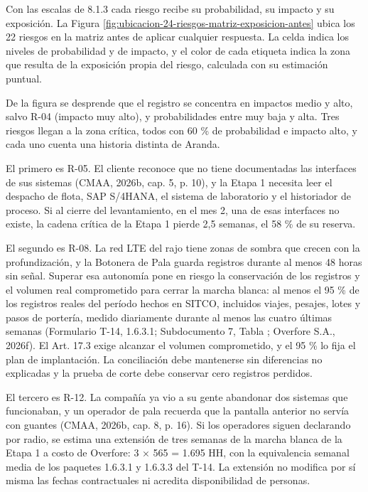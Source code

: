 \documentclass[subdoc]{../../comun/overfore}
\begin{document}
Con las escalas de 8.1.3 cada riesgo recibe su probabilidad, su impacto y su exposición. La Figura \ref{fig:ubicacion-24-riesgos-matriz-exposicion-antes} ubica los 22 riesgos en la matriz antes de aplicar cualquier respuesta. La celda indica los niveles de probabilidad y de impacto, y el color de cada etiqueta indica la zona que resulta de la exposición propia del riesgo, calculada con su estimación puntual.

De la figura se desprende que el registro se concentra en impactos medio y alto, salvo R-04 (impacto muy alto), y probabilidades entre muy baja y alta. Tres riesgos llegan a la zona crítica, todos con 60 \% de probabilidad e impacto alto, y cada uno cuenta una historia distinta de Aranda.

El primero es R-05. El cliente reconoce que no tiene documentadas las interfaces de sus sistemas (CMAA, 2026b, cap. 5, p. 10), y la Etapa 1 necesita leer el despacho de flota, SAP S/4HANA, el sistema de laboratorio y el historiador de proceso. Si al cierre del levantamiento, en el mes 2, una de esas interfaces no existe, la cadena crítica de la Etapa 1 pierde 2,5 semanas, el 58 \% de su reserva.

El segundo es R-08. La red LTE del rajo tiene zonas de sombra que crecen con la profundización, y la Botonera de Pala guarda registros durante al menos 48 horas sin señal. Superar esa autonomía pone en riesgo la conservación de los registros y el volumen real comprometido para cerrar la marcha blanca: al menos el 95 \% de los registros reales del período hechos en SITCO, incluidos viajes, pesajes, lotes y pasos de portería, medido diariamente durante al menos las cuatro últimas semanas (Formulario T-14, 1.6.3.1; Subdocumento 7, Tabla ; Overfore S.A., 2026f). El Art. 17.3 exige alcanzar el volumen comprometido, y el 95 \% lo fija el plan de implantación. La conciliación debe mantenerse sin diferencias no explicadas y la prueba de corte debe conservar cero registros perdidos.

El tercero es R-12. La compañía ya vio a su gente abandonar dos sistemas que funcionaban, y un operador de pala recuerda que la pantalla anterior no servía con guantes (CMAA, 2026b, cap. 8, p. 16). Si los operadores siguen declarando por radio, se estima una extensión de tres semanas de la marcha blanca de la Etapa 1 a costo de Overfore: 3 × 565 = 1.695 HH, con la equivalencia semanal media de los paquetes 1.6.3.1 y 1.6.3.3 del T-14. La extensión no modifica por sí misma las fechas contractuales ni acredita disponibilidad de personas.
\end{document}
